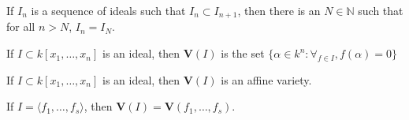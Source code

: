 \documentclass[crop=false,class=book,oneside]{standalone}
\begin{document}
                \begin{theorem}
                    If $I_n$ is a sequence of ideals such that
                    $I_{n}\subset I_{n+1}$, then there is an
                    $N\in\mathbb{N}$ such that for all $n>N$,
                    $I_n=I_N$.
                \end{theorem}
                \begin{definition}
                    If $I\subset k[x_1,\hdots ,x_n]$ is an ideal,
                    then $\textbf{V}(I)$ is the set
                    $\{\alpha\in k^n:\forall_{f\in I},f(\alpha)=0\}$
                \end{definition}
                \begin{theorem}
                    If $I\subset k[x_1,\hdots ,x_n]$ is an ideal,
                    then $\textbf{V}(I)$ is an affine variety.
                \end{theorem}
                \begin{theorem}
                    If $I=\langle f_1,\hdots, f_s\rangle$,
                    then $\textbf{V}(I)=\mathbf{V}(f_1,\hdots,f_s)$.
                \end{theorem}
\end{document}
